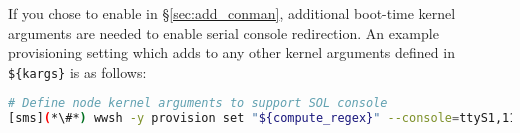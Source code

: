If you chose to enable \conman{} in \S\ref{sec:add_conman}, additional
boot-time kernel arguments are needed to enable serial console
redirection. An example provisioning setting which adds to any other kernel arguments defined
in \texttt{\$\{kargs\}} is as follows:

\begin{lstlisting}[language=bash,keywords={},upquote=true]
# Define node kernel arguments to support SOL console
[sms](*\#*) wwsh -y provision set "${compute_regex}" --console=ttyS1,115200
\end{lstlisting}
